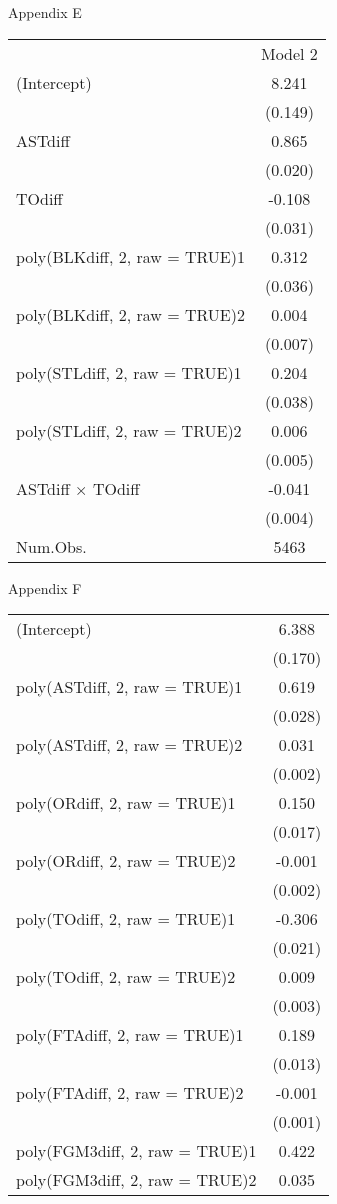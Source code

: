\documentclass{article}
\begin{document}
\newpage
Appendix E
\begin{table}
\centering
\begin{tabular}[t]{lc}
  & Model 2\\
(Intercept) & 8.241\\
 & (0.149)\\
ASTdiff & 0.865\\
 & (0.020)\\
TOdiff & -0.108\\
 & (0.031)\\
poly(BLKdiff, 2, raw = TRUE)1 & 0.312\\
 & (0.036)\\
poly(BLKdiff, 2, raw = TRUE)2 & 0.004\\
 & (0.007)\\
poly(STLdiff, 2, raw = TRUE)1 & 0.204\\
 & (0.038)\\
poly(STLdiff, 2, raw = TRUE)2 & 0.006\\
 & (0.005)\\
ASTdiff × TOdiff & -0.041\\
 & (0.004)\\
Num.Obs. & 5463\\
\end{tabular}
\end{table}
\newpage
Appendix F
\begin{table}
\centering
\begin{tabular}[t]{lc}
(Intercept) & 6.388\\
 & (0.170)\\
poly(ASTdiff, 2, raw = TRUE)1 & 0.619\\
 & (0.028)\\
poly(ASTdiff, 2, raw = TRUE)2 & 0.031\\
 & \vphantom{1} (0.002)\\
poly(ORdiff, 2, raw = TRUE)1 & 0.150\\
 & (0.017)\\
poly(ORdiff, 2, raw = TRUE)2 & -0.001\\
 & (0.002)\\
poly(TOdiff, 2, raw = TRUE)1 & -0.306\\
 & (0.021)\\
poly(TOdiff, 2, raw = TRUE)2 & 0.009\\
 & (0.003)\\
poly(FTAdiff, 2, raw = TRUE)1 & 0.189\\
 & (0.013)\\
poly(FTAdiff, 2, raw = TRUE)2 & -0.001\\
 & (0.001)\\
poly(FGM3diff, 2, raw = TRUE)1 & 0.422\\
poly(FGM3diff, 2, raw = TRUE)2 & 0.035\\
\end{tabular}
\end{table}
\end{document}
